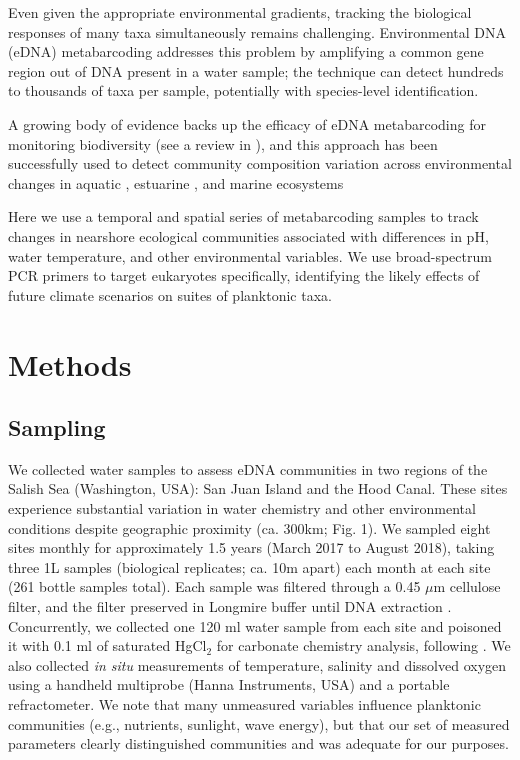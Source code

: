 \documentclass[11pt]{article}
\begin{document}
\begin{linenumbers}
Even given the appropriate environmental gradients, tracking the biological responses of many taxa simultaneously remains challenging. Environmental DNA (eDNA) metabarcoding \cite{holman2019detection, kelly2016genetic} addresses this problem by amplifying a common gene region out of DNA present in a water sample; the technique can detect hundreds to thousands of taxa per sample, potentially with species-level identification.  

{\color{red}A growing body of evidence backs up the efficacy of eDNA metabarcoding for monitoring biodiversity (see a review in \cite{ruppert2019past}), and this approach has been successfully used to detect community composition variation across environmental changes in aquatic  \cite{emilson2017dna}, estuarine \cite{chariton2015metabarcoding, lallias2015environmental}, and marine ecosystems \cite{berry2019marine}}



Here we use a temporal and spatial series of metabarcoding samples to track changes in nearshore ecological communities associated with differences in pH, water temperature, and other environmental variables. We use broad-spectrum PCR primers \cite{leray_new_2013} to target eukaryotes specifically, identifying the likely effects of future climate scenarios on suites of planktonic taxa. 

%


\section{Methods}
\subsection*{Sampling}

We collected water samples to assess eDNA communities in two regions of the Salish Sea (Washington, USA): San Juan Island and the Hood Canal. These sites experience substantial variation in water chemistry and other environmental conditions despite geographic proximity (ca. 300km; Fig. 1). We sampled eight sites monthly for approximately 1.5 years (March 2017 to August 2018), taking three 1L samples (biological replicates; ca. 10m apart) each month at each site (261 bottle samples total). Each sample was filtered through a 0.45 $\mu$m  cellulose filter, and the filter preserved in Longmire buffer until DNA extraction \cite{renshaw2015room}. Concurrently, we collected one 120 ml water sample from each site and poisoned it with 0.1 ml of saturated HgCl$_2$ for carbonate chemistry analysis, following \cite{riebesell2011guide}. We also collected \textit{in situ} measurements of temperature, salinity and dissolved oxygen using a handheld multiprobe (Hanna Instruments, USA) and a portable refractometer. We note that many unmeasured variables influence planktonic communities (e.g., nutrients, sunlight, wave energy), but that our set of measured parameters clearly distinguished communities and was adequate for our purposes.
  

\end{linenumbers}
\end{document}
